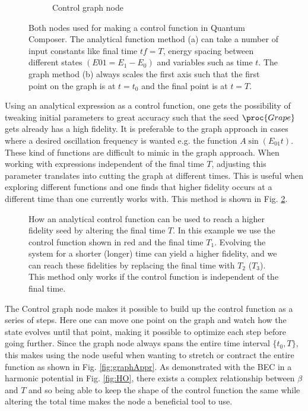 \documentclass[a4paper, twocolumn]{revtex4-1}
\begin{document}
\begin{figure}[h]
\begin{subfigure}[b]{0.45\columnwidth}
		\caption{Control graph node}
	\end{subfigure}
	\caption{Both nodes used for making a control function in Quantum Composer. The analytical function method (a) can take a number of input constants like final time $tf = T$, energy spacing between different states $(E01 = E_1 - E_0)$ and variables such as time $t$. The graph method (b) always scales the first axis such that the first point on the graph is at $t=t_0$ and the final point is at $t=T$.}
	\label{fig:Controls}
\end{figure}

Using an analytical expression as a control function, one gets the possibility of tweaking initial parameters to great accuracy such that the seed $\proc{Grape}$ gets already has a high fidelity. It is preferable to the graph approach in cases where a desired oscillation frequency is wanted e.g. the function $A\sin(E_{01}t)$. These kind of functions are difficult to mimic in the graph approach. When working with expressions independent of the final time $T$, adjusting this parameter translates into cutting the graph at different times. This is useful when exploring different functions and one finds that higher fidelity occurs at a different time than one currently works with. This method is shown in Fig. \ref{fig:funcAppr}. \\
\begin{figure}
	\def\svgwidth{\columnwidth}
	
	\caption{How an analytical control function can be used to reach a higher fidelity seed by altering the final time $T$. In this example we use the control function shown in red and the final time $T_1$. Evolving the system for a shorter (longer) time can yield a higher fidelity, and we can reach these fidelities by replacing the final time with $T_2$ ($T_3$). This method only works if the control function is independent of the final time.}
	\label{fig:funcAppr}
\end{figure}

The Control graph node makes it possible to build up the control function as a series of steps. Here one can move one point on the graph and watch how the state evolves until that point, making it possible to optimize each step before going further. Since the graph node always spans the entire time interval $\{t_0,T\}$, this makes using the node useful when wanting to stretch or contract the entire function as shown in Fig. \ref{fig:graphAppr}. As demonstrated with the BEC in a harmonic potential in Fig. \ref{fig:HO}, there exists a complex relationship between $\beta$ and $T$ and so being able to keep the shape of the control function the same while altering the total time makes the node a beneficial tool to use.\\
\end{document}
